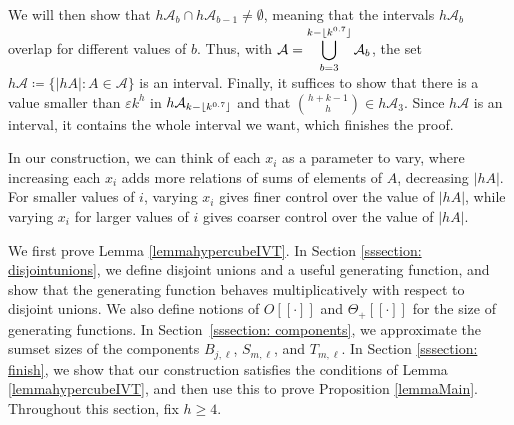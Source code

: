 \documentclass[10pt,a4paper]{article}
\theoremstyle{definition}
\theoremstyle{remark}
\numberwithin{equation}{section}
\numberwithin{theorem}{section}
\newcommand{\cala}{\mathcal{A}}
\DeclarePairedDelimiter{\floor}{\lfloor}{\rfloor}
\begin{document}
We will then show that $h\cala_b \cap h\cala_{b-1} \neq \emptyset$, meaning that the intervals $h\cala_b$ overlap for different values of $b$. Thus, with $\cala = \displaystyle \bigcup_{b=3}^{k-\floor{k^{0.7}}} \cala_b$, the set $h\cala\coloneq \{|hA|: A \in \cala\}$ is an interval. Finally, it suffices to show that there is a value smaller than $\varepsilon k^h$ in $h\cala_{k-\floor{k^{0.7}}}$ and that $\binom{h+k-1}{h} \in h\cala_3$. Since $h\cala$ is an interval, it contains the whole interval we want, which finishes the proof.

In our construction, we can think of each $x_i$ as a parameter to vary, where increasing each $x_i$ adds more relations of sums of elements of $A$, decreasing $|hA|$. For smaller values of $i$, varying $x_i$ gives finer control over the value of $|hA|$, while varying $x_i$ for larger values of $i$ gives coarser control over the value of $|hA|$.

We first prove Lemma \ref{lemmahypercubeIVT}. In Section \ref{sssection: disjointunions}, we define disjoint unions and a useful generating function, and show that the generating function behaves multiplicatively with respect to disjoint unions. We also define notions of $ O[[\cdot]]$ and $\Theta_+[[\cdot]]$ for the size of generating functions. In Section~\ref{sssection: components}, we approximate the sumset sizes of the components $B_{j,\ell}$, $S_{m,\ell}$, and $T_{m,\ell}$. In Section \ref{sssection: finish}, we show that our construction satisfies the conditions of Lemma \ref{lemmahypercubeIVT}, and then use this to prove Proposition \ref{lemmaMain}. Throughout this section, fix $h \geq 4$.
\end{document}

